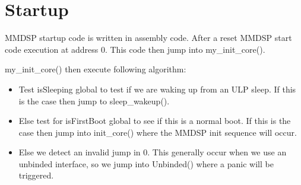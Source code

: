 \chapter{Startup}
MMDSP startup code is written in assembly code. After a reset MMDSP start code
execution at address 0. This code then jump into my\_init\_core().

my\_init\_core() then execute following algorithm:
\begin{itemize}
  \item Test isSleeping global to test if we are waking up from an ULP sleep. If
  this is the case then jump to sleep\_wakeup().
  \item Else test for isFirstBoot global to see if this is a normal boot. If
  this is the case then jump into init\_core() where the MMDSP init sequence
  will occur.
  \item Else we detect an invalid jump in 0. This generally occur when we use an
  unbinded interface, so we jump into Unbinded() where a panic will be
  triggered.
\end{itemize}
